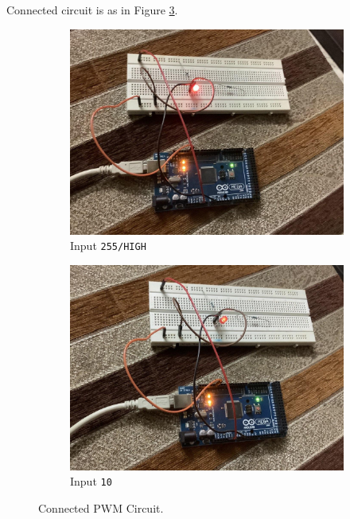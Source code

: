 \begin{arabicparts}
    \questionpart
    Connected circuit is as in Figure \ref{fig:pwmconnected}.
    \begin{figure}[ht]
        \centering
        \begin{subfigure}[b]{0.3\textwidth}
            \includegraphics[width=\textwidth]{fig/pwm-low.jpg}
            \caption{Input \texttt{255/HIGH}}
            \label{subfig:pwmhigh}            
        \end{subfigure}
        \begin{subfigure}[b]{0.3\textwidth}
            \includegraphics[width=\textwidth]{fig/pwm-high.jpg}
            \caption{Input \texttt{10}}
            \label{subfig:pwmlow}            
        \end{subfigure}
        \caption{Connected PWM Circuit.}
        \label{fig:pwmconnected}
    \end{figure}


\end{arabicparts}
